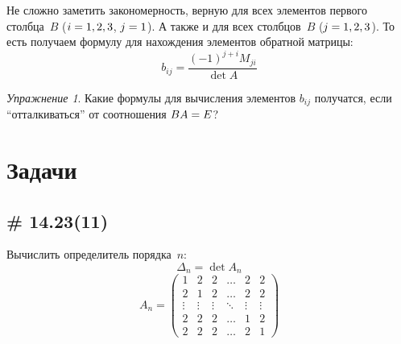 \documentclass[a4paper,12pt]{article}
\theoremstyle{remark}
\newtheorem*{exercise}{Упражнение}
\begin{document}
  Не сложно заметить закономерность, верную для всех элементов первого столбца~$B$ ($i \hm= 1, 2, 3$, $j \hm= 1$).
  А также и для всех столбцов~$B$ ($j \hm= 1, 2, 3$).
  То есть получаем формулу для нахождения элементов обратной матрицы:
  \begin{equation}\label{eq:inverse-matrix}
    \boxed{
      b_{ij} = \frac{(-1)^{j + i} M_{ji}}{\det A}
    }
  \end{equation}
  
  \begin{exercise}
    Какие формулы для вычисления элементов $b_{ij}$ получатся, если ``отталкиваться'' от соотношения $BA \hm= E$?
  \end{exercise}
  
  
  
  
  
  
  
  \section{Задачи}
  
  \subsection{\# 14.23(11)}
  
  Вычислить определитель порядка~$n$:
  \[
    \Delta_n = \det A_n
  \]
  \[
    A_n = \begin{pmatrix}
      1      & 2      & 2      & \ldots & 2      & 2\\
      2      & 1      & 2      & \ldots & 2      & 2\\
      \vdots & \vdots & \vdots & \ddots & \vdots & \vdots\\
      2      & 2      & 2      & \ldots & 1      & 2\\
      2      & 2      & 2      & \ldots & 2      & 1
    \end{pmatrix}
  \]
  
\end{document}

